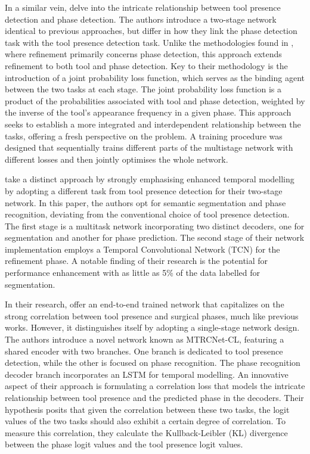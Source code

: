 In a similar vein, \citet{multitask_connectionism} delve into the intricate relationship between tool presence detection and phase detection. The authors introduce a two-stage network identical to previous approaches, but \citet{multitask_connectionism} differ in how they link the phase detection task with the tool presence detection task.
Unlike the methodologies found in \citep{tecno,twinanda2016lstm,EndoNet}, where refinement primarily concerns phase detection, this approach extends refinement to both tool and phase detection.
Key to their methodology is the introduction of a joint probability loss function, which serves as the binding agent between the two tasks at each stage. The joint probability loss function is a product of the probabilities associated with tool and phase detection, weighted by the inverse of the tool's appearance frequency in a given phase. This approach seeks to establish a more integrated and interdependent relationship between the tasks, offering a fresh perspective on the problem. A training procedure was designed that sequentially trains different parts of the multistage network with different losses and then jointly optimises the whole network.

\citet{Sanchez-Matilla2022_data_centric} take a distinct approach by strongly emphasising enhanced temporal modelling by adopting a different task from tool presence detection for their two-stage network. In this paper, the authors opt for semantic segmentation and phase recognition, deviating from the conventional choice of tool presence detection.
The first stage is a multitask network incorporating two distinct decoders, one for segmentation and another for phase prediction. The second stage of their network implementation employs a Temporal Convolutional Network (TCN) for the refinement phase. A notable finding of their research is the potential for performance enhancement with as little as 5\% of the data labelled for segmentation.

In their research, \citet{multi_task_recurrent_conv} offer an end-to-end trained network that capitalizes on the strong correlation between tool presence and surgical phases, much like previous works. However, it distinguishes itself by adopting a single-stage network design.
The authors introduce a novel network known as MTRCNet-CL, featuring a shared encoder with two branches. One branch is dedicated to tool presence detection, while the other is focused on phase recognition. The phase recognition decoder branch incorporates an LSTM for temporal modelling.
An innovative aspect of their approach is formulating a correlation loss that models the intricate relationship between tool presence and the predicted phase in the decoders. Their hypothesis posits that given the correlation between these two tasks, the logit values of the two tasks should also exhibit a certain degree of correlation. To measure this correlation, they calculate the Kullback-Leibler (KL) divergence between the phase logit values and the tool presence logit values.


